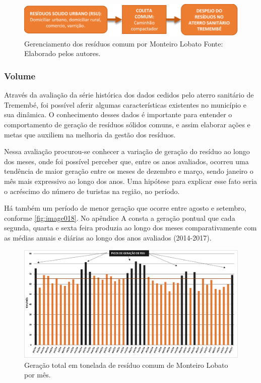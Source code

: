 	\begin{figure}
	\centering
	\includegraphics[width=0.75\linewidth]{produtos/prodtres/image017a}
	\caption{Gerenciamento dos resíduos comum por Monteiro Lobato Fonte: Elaborado pelos autores.}
	\label{fig:image017a}
\end{figure}
	
	\subsubsection{Volume}
	
	Através da avaliação da série histórica dos dados cedidos pelo aterro sanitário de Tremembé, foi possível aferir algumas características existentes no município e sua dinâmica. O conhecimento desses dados é importante para entender o comportamento de geração de resíduos sólidos comuns, e assim elaborar ações e metas que auxiliem na melhoria da gestão dos resíduos.
	
	Nessa avaliação procurou-se conhecer a variação de geração do resíduo ao longo dos meses, onde foi possível perceber que, entre os anos avaliados, ocorreu uma tendência de maior geração entre os meses de dezembro e março, sendo janeiro o mês mais expressivo ao longo dos anos. Uma hipótese para explicar esse fato seria o acréscimo do número de turistas na região, no período.
	
	Há também um período de menor geração que ocorre entre agosto e setembro, conforme \autoref{fig:image018}. No apêndice A consta a geração pontual que cada segunda, quarta e sexta feira produzia ao longo dos meses comparativamente com as médias anuais e diárias ao longo dos anos avaliados (2014-2017).
	
	\begin{figure}
		\centering
		\includegraphics[width=1\linewidth]{produtos/prodtres/image018}
		\caption{Geração total em tonelada de resíduo comum de Monteiro Lobato por mês.}
		\label{fig:image018}
	\end{figure}
	
